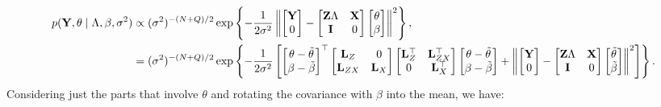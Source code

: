 \documentclass[10pt]{article}
\begin{document}
\begin{align*}
p({\bf Y}, \theta \mid \Lambda, \beta, \sigma^2) & \propto
(\sigma^2)^{-(N+Q)/2}\exp\left\{-\frac{1}{2\sigma^2}\left\|
\begin{bmatrix} {\bf Y} \\ 0 \end{bmatrix}
-\begin{bmatrix}{\bf Z}\Lambda & {\bf X} \\ {\bf I} & 0 \end{bmatrix}
\begin{bmatrix}\theta \\ \beta\end{bmatrix}
\right\|^2\right\}, \\
%
&= 
(\sigma^2)^{-(N+Q)/2}\exp\left\{-\frac{1}{2\sigma^2}\left[
\begin{bmatrix}\theta-\tilde{\theta} \\ \beta -
  \tilde\beta\end{bmatrix}^\top
\begin{bmatrix}
{\bf L}_Z & 0 \\ {\bf L}_{ZX} & {\bf L}_X \end{bmatrix}
\begin{bmatrix}
{\bf L}_Z^\top & {\bf L}_{ZX}^\top \\ 0 & {\bf L}_X^\top \end{bmatrix}
\begin{bmatrix}\theta-\tilde{\theta} \\ \beta -
  \tilde\beta\end{bmatrix} +
\left\|
\begin{bmatrix} {\bf Y} \\ 0 \end{bmatrix}
-\begin{bmatrix}{\bf Z}\Lambda & {\bf X} \\ {\bf I} & 0 \end{bmatrix}
\begin{bmatrix}\tilde\theta \\ \tilde\beta\end{bmatrix}
\right\|^2
\right]\right\}.
\end{align*}
Considering just the parts that involve $\theta$ and rotating the
covariance with $\beta$ into the mean, we have:
\end{document}
